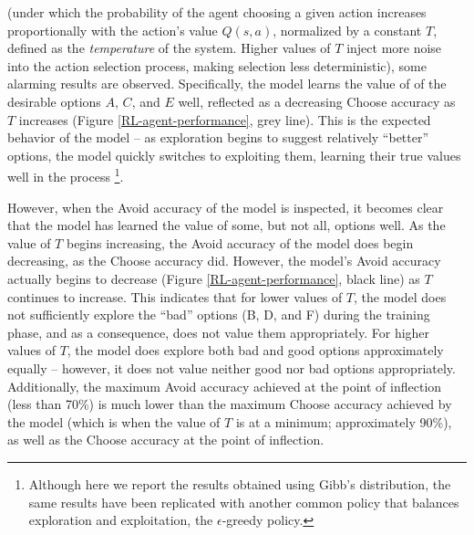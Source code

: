 \documentclass[10pt,letterpaper]{article}
\begin{document}
(under which the probability of the agent choosing a given action increases proportionally with the action's value $Q(s,a)$, normalized by a constant $T$, defined as the \emph{temperature} of the system. Higher values of $T$ inject more noise into the action selection process, making selection less deterministic), some alarming results are observed. Specifically, the model learns the value of of the desirable options $A$, $C$, and $E$ well, reflected as a decreasing Choose accuracy as $T$ increases (Figure \ref{RL-agent-performance}, grey line). This is the expected behavior of the model -- as exploration begins to suggest relatively ``better'' options, the model quickly switches to exploiting them, learning their true values well in the process \footnote{Although here we report the results obtained using Gibb's distribution, the same results have been replicated with another common policy that balances exploration and exploitation, the $\epsilon$-greedy policy.}. 

However, when the Avoid accuracy of the model is inspected, it becomes clear that the model has learned the value of some, but not all, options well. As the value of $T$ begins increasing, the Avoid accuracy of the model does begin decreasing, as the Choose accuracy did. However, the model's Avoid accuracy actually begins to decrease (Figure \ref{RL-agent-performance}, black line) as $T$ continues to increase. This indicates that for lower values of $T$, the model does not sufficiently explore the ``bad'' options (B, D, and F) during the training phase, and as a consequence, does not value them appropriately. For higher values of $T$, the model does explore both bad and good options approximately equally -- however, it does not value neither good nor bad options appropriately. Additionally, the maximum Avoid accuracy achieved at the point of inflection (less than 70\%) is much lower than the maximum Choose accuracy achieved by the model (which is when the value of $T$ is at a minimum; approximately 90\%), as well as the Choose accuracy at the point of inflection. 
\end{document}
